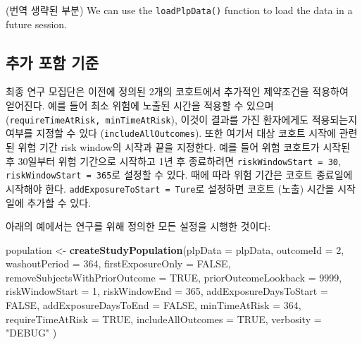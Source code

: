 \documentclass[10.5pt]{book}
\newenvironment{Shaded}{\begin{snugshade}}{\end{snugshade}}
\newcommand{\KeywordTok}[1]{\textcolor[rgb]{0.13,0.29,0.53}{\textbf{#1}}}
\newcommand{\DataTypeTok}[1]{\textcolor[rgb]{0.13,0.29,0.53}{#1}}
\newcommand{\DecValTok}[1]{\textcolor[rgb]{0.00,0.00,0.81}{#1}}
\newcommand{\StringTok}[1]{\textcolor[rgb]{0.31,0.60,0.02}{#1}}
\newcommand{\OtherTok}[1]{\textcolor[rgb]{0.56,0.35,0.01}{#1}}
\newcommand{\NormalTok}[1]{#1}
\theoremstyle{definition}
\theoremstyle{definition}
\theoremstyle{definition}
\theoremstyle{remark}
\begin{document}
(번역 생략된 부분) We can use the \texttt{loadPlpData()} function to
load the data in a future session.

\subsection{추가 포함 기준}\label{--}

최종 연구 모집단은 이전에 정의된 2개의 코호트에서 추가적인 제약조건을
적용하여 얻어진다. 예를 들어 최소 위험에 노출된 시간을 적용할 수 있으며
(\texttt{requireTimeAtRisk,\ minTimeAtRisk}), 이것이 결과를 가진
환자에게도 적용되는지 여부를 지정할 수 있다
(\texttt{includeAllOutcomes}). 또한 여기서 대상 코호트 시작에 관련된
위험 기간 risk window의 시작과 끝을 지정한다. 예를 들어 위험 코호트가
시작된 후 30일부터 위험 기간으로 시작하고 1년 후 종료하려면
\texttt{riskWindowStart\ =\ 30}, \texttt{riskWindowStart\ =\ 365}로
설정할 수 있다. 때에 따라 위험 기간은 코호트 종료일에 시작해야 한다.
\texttt{addExposureToStart\ =\ Ture}로 설정하면 코호트 (노출) 시간을
시작일에 추가할 수 있다.

아래의 예에서는 연구를 위해 정의한 모든 설정을 시행한 것이다:

\begin{Shaded}
\begin{Highlighting}[]
\NormalTok{population <-}\StringTok{ }\KeywordTok{createStudyPopulation}\NormalTok{(}\DataTypeTok{plpData =}\NormalTok{ plpData,}
                                    \DataTypeTok{outcomeId =} \DecValTok{2}\NormalTok{,}
                                    \DataTypeTok{washoutPeriod =} \DecValTok{364}\NormalTok{,}
                                    \DataTypeTok{firstExposureOnly =} \OtherTok{FALSE}\NormalTok{,}
                                    \DataTypeTok{removeSubjectsWithPriorOutcome =} \OtherTok{TRUE}\NormalTok{,}
                                    \DataTypeTok{priorOutcomeLookback =} \DecValTok{9999}\NormalTok{,}
                                    \DataTypeTok{riskWindowStart =} \DecValTok{1}\NormalTok{,}
                                    \DataTypeTok{riskWindowEnd =} \DecValTok{365}\NormalTok{,}
                                    \DataTypeTok{addExposureDaysToStart =} \OtherTok{FALSE}\NormalTok{,}
                                    \DataTypeTok{addExposureDaysToEnd =} \OtherTok{FALSE}\NormalTok{,}
                                    \DataTypeTok{minTimeAtRisk =} \DecValTok{364}\NormalTok{,}
                                    \DataTypeTok{requireTimeAtRisk =} \OtherTok{TRUE}\NormalTok{,}
                                    \DataTypeTok{includeAllOutcomes =} \OtherTok{TRUE}\NormalTok{,}
                                    \DataTypeTok{verbosity =} \StringTok{"DEBUG"}
\NormalTok{)}
\end{Highlighting}
\end{Shaded}
\end{document}
